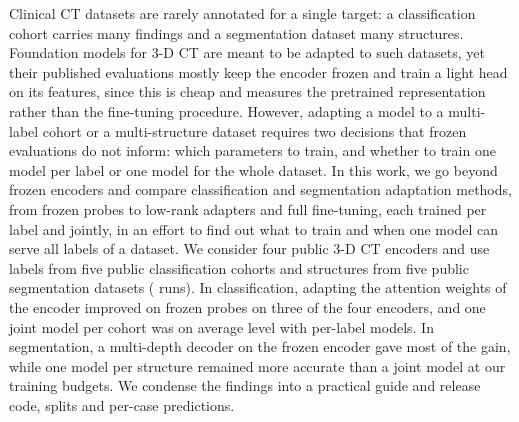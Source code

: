 Clinical CT datasets are rarely annotated for a single target: a classification cohort carries many findings and a segmentation dataset many structures. Foundation models for 3-D CT are meant to be adapted to such datasets, yet their published evaluations mostly keep the encoder frozen and train a light head on its features, since this is cheap and measures the pretrained representation rather than the fine-tuning procedure. However, adapting a model to a multi-label cohort or a multi-structure dataset requires two decisions that frozen evaluations do not inform: which parameters to train, and whether to train one model per label or one model for the whole dataset. In this work, we go beyond frozen encoders and compare \numClsMethodsN{} classification and \numSegMethodsN{} segmentation adaptation methods, from frozen probes to low-rank adapters and full fine-tuning, each trained per label and jointly, in an effort to find out what to train and when one model can serve all labels of a dataset. We consider four public 3-D CT encoders and use \numLabelsN{} labels from five public classification cohorts and \numStructuresN{} structures from five public segmentation datasets (\numRunsMainN{} runs). In classification, adapting the attention weights of the encoder improved on frozen probes on three of the four encoders, and one joint model per cohort was on average level with per-label models. In segmentation, a multi-depth decoder on the frozen encoder gave most of the gain, while one model per structure remained more accurate than a joint model at our training budgets. We condense the findings into a practical guide and release code, splits and per-case predictions.

